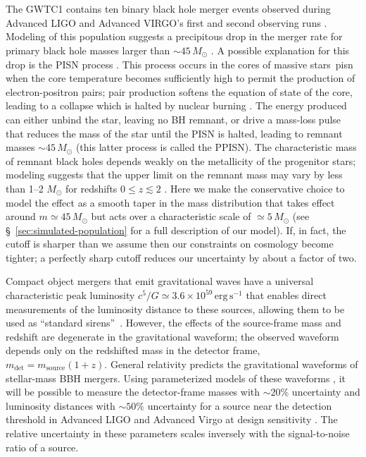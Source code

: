 \documentclass[modern]{aastex62}
\newcommand{\MPISN}{45 \, \MSun{}}
\newcommand{\MTaperScale}{5 \, \MSun{}}
\newcommand{\MSun}{M_\odot}
\begin{document}
\section*{ }

The \ac{GWTC1} contains ten binary black hole merger events observed during
Advanced LIGO and Advanced VIRGO's first and second observing runs
\citep{GWTC-1}. Modeling of this population suggests a precipitous drop in the
merger rate for primary black hole masses larger than $\sim \MPISN{}$
\citep{Fishbach2017,GWTC-1}.  A possible explanation for this drop is the
\ac{PISN} process
\citep{Fowler1964,Rakavy1967,Bond1984,Heger2002,Belczynski2016,Woosley2017,Spera2017,Leung2019}.
This process occurs in the cores of massive stars~\citep[helium core masses $30$--$133
\, \MSun$;][]{Woosley2017}pisn when the core temperature becomes sufficiently
high to permit the production of electron-positron pairs; pair production
softens the equation of state of the core, leading to a collapse which is halted
by nuclear burning \citep{Heger2002}.  The energy produced can either unbind the
star, leaving no \ac{BH} remnant, or drive a mass-loss pulse that reduces the
mass of the star until the \ac{PISN} is halted, leading to remnant masses $\sim
\MPISN{}$ (this latter process is called the \ac{PPISN}). The characteristic
mass of remnant black holes depends weakly on the metallicity of the progenitor
stars; modeling suggests that the upper limit on the remnant mass may vary by
less than 1--2 $\MSun$ for redshifts $0 \leq z \lesssim 2$
\citep{Belczynski2016,Mapelli2017}.  Here we make the conservative choice to
model the effect as a smooth taper in the mass distribution that takes effect
around $m \simeq \MPISN{}$ but acts over a characteristic scale of $\simeq
\MTaperScale$ (see \S\ \ref{sec:simulated-population} for a full description of
our model).  If, in fact, the cutoff is sharper than we assume then our
constraints on cosmology become tighter; a perfectly sharp cutoff reduces our
uncertainty by about a factor of two.

Compact object mergers that emit gravitational waves have a universal
characteristic peak luminosity $c^5/G \simeq 3.6 \times 10^{59} \, \mathrm{erg}
\, \mathrm{s}^{-1}$ that enables direct measurements of the luminosity distance
to these sources, allowing them to be used as ``standard sirens''~\citep{Schutz1986,Holz2005}.
However, the effects of the source-frame mass and redshift are
degenerate in the gravitational waveform; the observed waveform depends only on
the redshifted mass in the detector frame, $m_\mathrm{det} = m_\mathrm{source}
(1 + z)$. General relativity predicts the gravitational waveforms of
stellar-mass \ac{BBH} mergers.  Using parameterized models of these waveforms
\citep{Taracchini2014,Kahn2016,Bohe2017,Chatziioannou2017}, it will be possible
to measure the detector-frame masses with $\sim 20\%$ uncertainty and luminosity
distances \citep{Hogg1999} with $\sim 50\%$ uncertainty for a source near the
detection threshold in Advanced LIGO and Advanced Virgo at design sensitivity
\citep{Vitale2017}.  The relative uncertainty in these parameters scales
inversely with the signal-to-noise ratio of a source.
\end{document}
